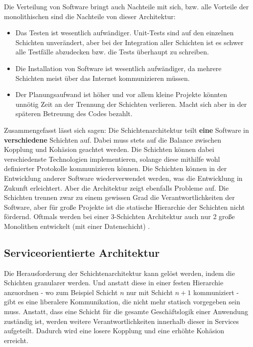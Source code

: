 Die Verteilung von Software bringt auch Nachteile mit sich, bzw. alle Vorteile der monolithischen sind die Nachteile von dieser Architektur:
\begin{itemize}
    \item Das Testen ist wesentlich aufwändiger. Unit-Tests sind auf den einzelnen Schichten unverändert, aber bei der Integration aller Schichten ist es schwer alle Testfälle abzudecken bzw. die Tests überhaupt zu schreiben.
    \item Die Installation von Software ist wesentlich aufwändiger, da mehrere Schichten meist über das Internet kommunizieren müssen.
    \item Der Planungsaufwand ist höher und vor allem kleine Projekte könnten unnötig Zeit an der Trennung der Schichten verlieren. Macht sich aber in der späteren Betreuung des Codes bezahlt.
\end{itemize}

Zusammengefasst lässt sich sagen: Die Schichtenarchitektur teilt \textbf{eine} Software in \textbf{verschiedene} Schichten auf. Dabei muss stets auf die Balance zwischen Kopplung und Kohäsion geachtet werden. Die Schichten können dabei verschiedenste Technologien implementieren, solange diese mithilfe wohl definierter Protokolle kommunizieren können. Die Schichten können in der Entwicklung anderer Software wiederverwendet werden, was die Entwicklung in Zukunft erleichtert. Aber die Architektur zeigt ebenfalls Probleme auf. Die Schichten trennen zwar zu einem gewissen Grad die Verantwortlichkeiten der Software, aber für große Projekte ist die statische Hierarchie der Schichten nicht fördernd. Oftmals werden bei einer 3-Schichten Architektur auch nur 2 große Monolithen entwickelt (mit einer Datenschicht) \cite{FrankBuschmann.}. 

\subsection{Serviceorientierte Architektur}
\label{sec:historySoa}

Die Herausforderung der Schichtenarchitektur kann gelöst werden, indem die \glqq Schichten\grqq{} granularer werden. Und anstatt diese in einer festen Hierarchie anzuordnen - wo zum Beispiel Schicht $n$ nur mit Schicht $n+1$ kommuniziert - gibt es eine liberalere Kommunikation, die nicht mehr statisch vorgegeben sein muss. Anstatt, dass eine Schicht für die gesamte Geschäftslogik einer Anwendung zuständig ist, werden weitere Verantwortlichkeiten innerhalb dieser in Services aufgeteilt. Dadurch wird eine losere Kopplung und eine erhöhte Kohäsion erreicht. 

